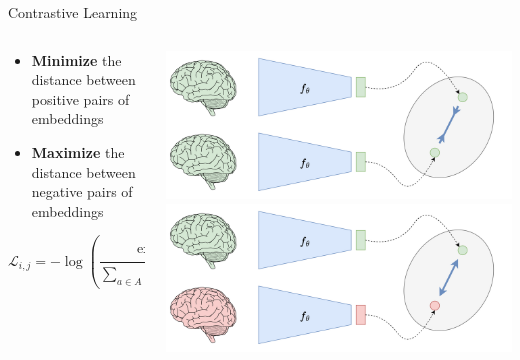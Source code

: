 \documentclass[12pt,aspectratio=169]{beamer}
\begin{document}
\begin{frame}{Contrastive Learning}
\begin{columns}
\begin{column}{0.5\textwidth}
    \begin{itemize}
        \item \textbf{Minimize} the distance between positive pairs of embeddings 
        \item \textbf{Maximize} the distance between negative pairs of embeddings
    \end{itemize}
    \vspace{35pt}
    \begin{equation*}
    \mathscr{L}_{i, j} = - \log \left(
        \frac
        {\exp(s_{i,j} / \tau)}
        {\sum\limits_{a \in A(i)} \exp(s_{i, a} / \tau)}
    \right)
    \end{equation*}
\end{column}
\begin{column}{0.5\textwidth}
\begin{center}
    \includegraphics[width=.9\textwidth]{source/contrastive_pulling.png}\\
    \vspace{15pt}
    \includegraphics[width=.9\textwidth]{source/contrastive_pushing.png}\\
\end{center}
\end{column}
\end{columns}
\end{frame}
\end{document}

